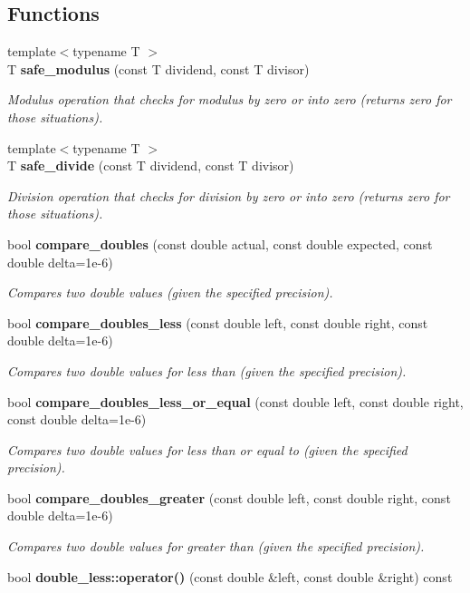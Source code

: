\subsection*{Functions}
\begin{DoxyCompactItemize}
\item 
{\footnotesize template$<$typename T $>$ }\\T {\bf safe\+\_\+modulus} (const T dividend, const T divisor)
\begin{DoxyCompactList}\small\item\em Modulus operation that checks for modulus by zero or into zero (returns zero for those situations). \end{DoxyCompactList}\item 
{\footnotesize template$<$typename T $>$ }\\T {\bf safe\+\_\+divide} (const T dividend, const T divisor)
\begin{DoxyCompactList}\small\item\em Division operation that checks for division by zero or into zero (returns zero for those situations). \end{DoxyCompactList}\item 
bool {\bf compare\+\_\+doubles} (const double actual, const double expected, const double delta=1e-\/6)
\begin{DoxyCompactList}\small\item\em Compares two double values (given the specified precision). \end{DoxyCompactList}\item 
bool {\bf compare\+\_\+doubles\+\_\+less} (const double left, const double right, const double delta=1e-\/6)
\begin{DoxyCompactList}\small\item\em Compares two double values for less than (given the specified precision). \end{DoxyCompactList}\item 
bool {\bf compare\+\_\+doubles\+\_\+less\+\_\+or\+\_\+equal} (const double left, const double right, const double delta=1e-\/6)
\begin{DoxyCompactList}\small\item\em Compares two double values for less than or equal to (given the specified precision). \end{DoxyCompactList}\item 
bool {\bf compare\+\_\+doubles\+\_\+greater} (const double left, const double right, const double delta=1e-\/6)
\begin{DoxyCompactList}\small\item\em Compares two double values for greater than (given the specified precision). \end{DoxyCompactList}\item 
bool {\bfseries double\+\_\+less\+::operator()} (const double \&left, const double \&right) const \label{group___mathematics_ga8ab290c346a3fa091aac241536ce1c95}


\end{DoxyCompactItemize}
